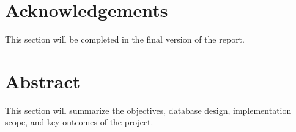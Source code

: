 \documentclass[12pt,a4paper,oneside]{report}
\begin{document}
\setcounter{page}{1}

\chapter*{Acknowledgements}
This section will be completed in the final version of the report.

\chapter*{Abstract}
This section will summarize the objectives, database design, implementation scope, and key outcomes of the project.

\tableofcontents
\clearpage
{}
{}
\listoffigures
\clearpage
{}
{}
\listoftables
\clearpage
{}
{}
\lstlistoflistings
\clearpage

\clearpage

\setcounter{page}{1}







\end{document}
